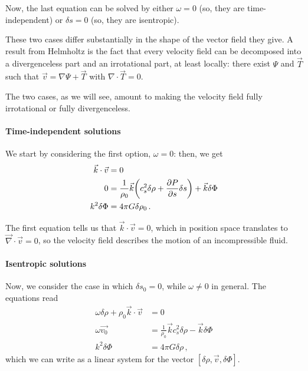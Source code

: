 \documentclass[main.tex]{subfiles}
\begin{document}
Now, the last equation can be solved by either \(\omega = 0\) (so, they are time-independent) or \(\delta s = 0\) (so, they are isentropic).

These two cases differ substantially in the shape of the vector field they give. 
A result from Helmholtz is the fact that every velocity field can be decomposed into a divergenceless part and an irrotational part, at least locally: there exist \(\Psi\) and \(\vec{T}\) such that \(\vec{v} = \nabla \Psi + \vec{T}\) with \(\nabla \cdot \vec{T} = 0\). 

The two cases, as we will see, amount to making the velocity field fully irrotational or fully divergenceless.

\paragraph{Time-independent solutions}
We start by considering the first option, \(\omega = 0\): then, we get
%
\begin{subequations}
\begin{align}
  \vec{k} \cdot \vec{v} &=0  \\
  0 &= \frac{1}{\rho_0 }  \vec{k}
  \qty(c^2_s \delta \rho + \pdv{P}{s} \delta s ) 
  + \vec{k} \delta \Phi \\
  k^2 \delta \Phi &= 4 \pi G \delta \rho_0  
\,.
\end{align}
\end{subequations}

The first equation tells us that \(\vec{k} \cdot \vec{v} = 0\), which in position space translates to \(\vec{\nabla} \cdot \vec{v} = 0\), so the velocity field describes the motion of an incompressible fluid.




\paragraph{Isentropic solutions}
Now, we consider the case in which \(\delta s_0 =0\), while \(\omega \neq 0\) in general. The equations read
%
\begin{subequations}
\begin{align}
  \omega \delta \rho + \rho_0 \vec{k} \cdot \vec{v} &=0  \\
  \omega \vec{v_0} &= \frac{1}{\rho_0 } \vec{k}
  c^2_s \delta \rho
  - \vec{k} \delta \Phi \\
  k^2 \delta \Phi &= 4 \pi G \delta \rho 
\,,
\end{align}
\end{subequations}
%
which we can write as a linear system for the vector \([\delta \rho, \vec{v}, \delta \Phi ]\). 
\end{document}
